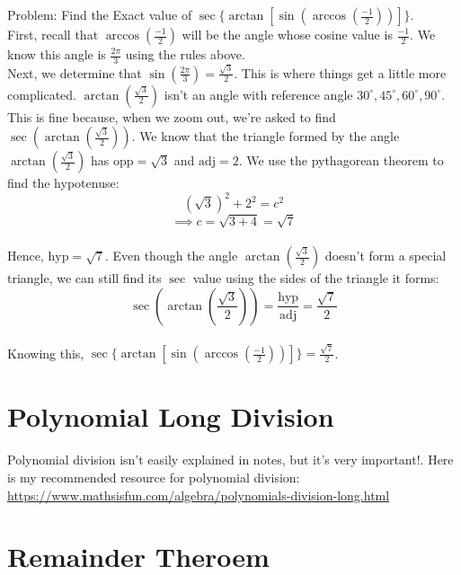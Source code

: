 \documentclass[12pt]{article}
\begin{document}
Problem: Find the Exact value of \(\sec\{\arctan[\sin(\arccos(\frac{-1}{2}))]\}\).\\

First, recall that \(\arccos(\frac{-1}{2})\) will be the angle whose cosine value is \(\frac{-1}{2}\). We know this angle is \(\frac{2\pi}{3}\) using the rules above.\\

Next, we determine that \(\sin(\frac{2\pi}{3})=\frac{\sqrt{3}}{2}\). This is where things get a little more complicated. \(\arctan(\frac{\sqrt{3}}{2})\) isn't an angle with reference angle \(30^{\circ}, 45^{\circ}, 60^{\circ}, 90^{\circ}\). This is fine because, when we zoom out, we're asked to find \(\sec(\arctan(\frac{\sqrt{3}}{2}))\). We know that the triangle formed by the angle \(\arctan(\frac{\sqrt{3}}{2})\) has \(\text{opp}=\sqrt{3}\) and \(\text{adj}=2\). We use the pythagorean theorem to find the hypotenuse:\\

\[(\sqrt{3})^2+2^2=c^2\]
\[\implies c=\sqrt{3+4}=\sqrt{7}\]\\

Hence, \(\text{hyp}=\sqrt{7}\). Even though the angle \(\arctan(\frac{\sqrt{3}}{2})\) doesn't form a special triangle, we can still find its \(\sec\) value using the sides of the triangle it forms:\\

\[\sec\left(\arctan\left(\frac{\sqrt{3}}{2}\right)\right)=\frac{\text{hyp}}{\text{adj}}=\frac{\sqrt{7}}{2}\]\\

Knowing this, \(\sec\{\arctan[\sin(\arccos(\frac{-1}{2}))]\}=\frac{\sqrt{7}}{2}\).

\section{Polynomial Long Division}

Polynomial division isn't easily explained in notes, but it's very important!. Here is my recommended resource for polynomial division:\\

\url{https://www.mathsisfun.com/algebra/polynomials-division-long.html}

\section{Remainder Theroem}
\end{document}
